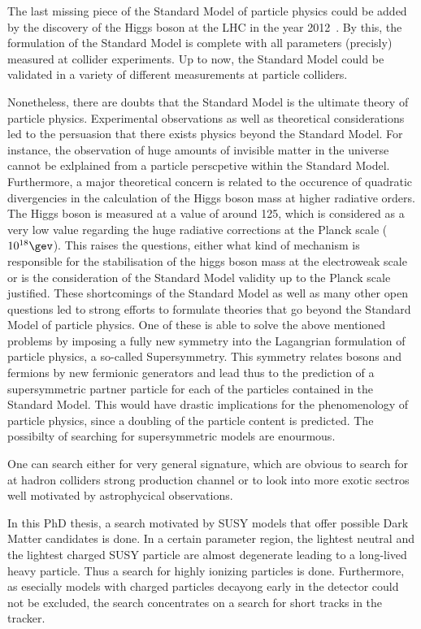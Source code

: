 The last missing piece of the Standard Model of particle physics could be added by the discovery of the Higgs boson at the LHC in the year 2012~\cite{FIXME}.
By this, the formulation of the Standard Model is complete with all parameters (precisly) measured at collider experiments.
Up to now, the Standard Model could be validated in a variety of different measurements at particle colliders.

Nonetheless, there are doubts that the Standard Model is the ultimate theory of particle physics.
Experimental observations as well as theoretical considerations led to the persuasion that there exists physics beyond the Standard Model.
For instance, the observation of huge amounts of invisible matter in the universe cannot be exlplained from a particle perscpetive within the Standard Model.
Furthermore, a major theoretical concern is related to the occurence of quadratic divergencies in the calculation of the Higgs boson mass at higher radiative orders.
The Higgs boson is measured at a value of around 125\gev, which is considered as a very low value regarding the huge radiative corrections at the Planck scale ($10^{18}\gev$). 
This raises the questions, either what kind of mechanism is responsible for the stabilisation of the higgs boson mass at the electroweak scale or is the consideration of the Standard Model validity up to the Planck scale justified.
These shortcomings of the Standard Model as well as many other open questions led to strong efforts to formulate theories that go beyond the Standard Model of particle physics. 
One of these is able to solve the above mentioned problems by imposing a fully new symmetry into the Lagangrian formulation of particle physics, a so-called Supersymmetry.
This symmetry relates bosons and fermions by new fermionic generators and lead thus to the prediction of a supersymmetric partner particle for each of the particles contained in the Standard Model.
This would have drastic implications for the phenomenology of particle physics, since a doubling of the particle content is predicted.
The possibilty of searching for supersymmetric models are enourmous.

One can search either for very general signature, which are obvious to search for at hadron colliders strong production channel or to look into more exotic sectros well motivated by astrophycical observations.

In this PhD thesis, a search motivated by SUSY models that offer possible Dark Matter candidates is done.
In a certain parameter region, the lightest neutral and the lightest charged SUSY particle are almost degenerate leading to a long-lived heavy particle.
Thus a search for highly ionizing particles is done.
Furthermore, as esecially models with charged particles decayong early in the detector could not be excluded, the search concentrates on a search for short tracks in the tracker.

